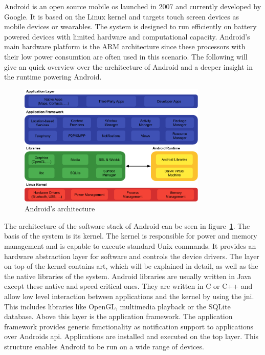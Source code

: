 
Android is an open source mobile \gls{os} launched in 2007 and currently developed by Google.
It is based on the Linux kernel and targets touch screen devices as mobile devices or wearables.
The system is designed to run efficiently on battery powered devices with limited hardware and computational capacity.
Android's main hardware platform is the ARM architecture since these processors with their low power consumtion are often used in this scenario.
The following will give an quick overview over the architecture of Android and a deeper insight in the runtime powering Android.

\begin{figure}[h]
    \centering
    \includegraphics[width=0.8\textwidth]{data/stack.png}
    \caption{Android's architecture \cite{androidStack}}
    \label{fig:androidArchitecture}
\end{figure}

The architecture of the software stack of Android can be seen in figure~\ref{fig:androidArchitecture}.
\newline
The basis of the system is its kernel.
The kernel is responsible for power and memory management and is capable to execute standard Unix commands.
It provides an hardware abstraction layer for software and controls the device drivers.
\newline
The layer on top of the kernel contains \gls{art}, which will be explained in detail, as well as the the native libraries of the system.
Android libraries are usually written in Java except these native and speed critical ones.
They are written in C or C++ and allow low level interaction between applications and the kernel by using the \gls{jni}.
This includes libraries like OpenGL, multimedia playback or the SQLite database.
\newline
Above this layer is the application framework.
The application framework provides generic functionality as notification support to applications over Androids \gls{api}.
\newline
Applications are installed and executed on the top layer.
\newline
This structure enables Android to be run on a wide range of devices.




